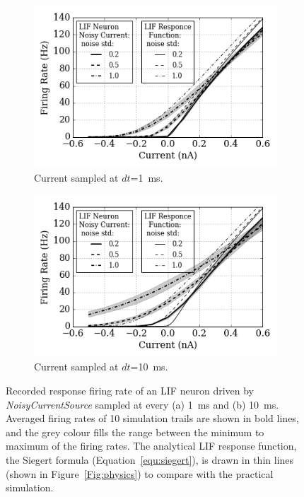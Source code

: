 	
	\begin{figure}[tbp!]
		\centering
		\begin{subfigure}[t]{0.49\textwidth}
			\includegraphics[width=\textwidth]{pics_iconip/2-1.png}
			\caption{Current sampled at $dt$=1~ms.}
		\end{subfigure}
		\begin{subfigure}[t]{0.49\textwidth}
			\includegraphics[width=\textwidth]{pics_iconip/2-10.png}
			\caption{Current sampled at $dt$=10~ms.}
		\end{subfigure}
		\caption{Recorded response firing rate of an LIF neuron driven by \textit{NoisyCurrentSource} sampled at every (a) 1~ms and (b) 10~ms. Averaged firing rates of 10 simulation trails are shown in bold lines, and the grey colour fills the range between the minimum to maximum of the firing rates. The analytical LIF response function, the Siegert formula (Equation~\ref{equ:siegert}), is drawn in thin lines (shown in Figure~\ref{Fig:physics}) to compare with the practical simulation.}
		\label{Fig:current}
	\end{figure}
		

